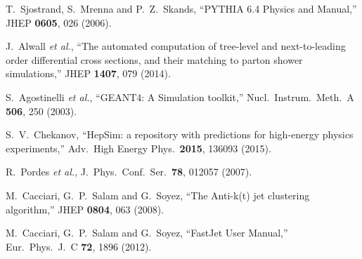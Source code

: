 \documentclass{PoS}
\begin{document}
\begin{thebibliography}{99}
  T.~Sjostrand, S.~Mrenna and P.~Z.~Skands,
  ``PYTHIA 6.4 Physics and Manual,''
  JHEP {\bf 0605}, 026 (2006).

  J.~Alwall {\it et al.},
  ``The automated computation of tree-level and next-to-leading order differential cross sections, and their matching to parton shower simulations,''
  JHEP {\bf 1407}, 079 (2014).




  S.~Agostinelli {\it et al.},
  ``GEANT4: A Simulation toolkit,''
  Nucl.\ Instrum.\ Meth.\ A {\bf 506}, 250 (2003).


  S.~V.~Chekanov,
  ``HepSim: a repository with predictions for high-energy physics experiments,''
  Adv.\ High Energy Phys.\  {\bf 2015}, 136093 (2015).

  R.~Pordes {\it et al.},
  J.\ Phys.\ Conf.\ Ser.\  {\bf 78}, 012057 (2007).



  M.~Cacciari, G.~P.~Salam and G.~Soyez,
  ``The Anti-k(t) jet clustering algorithm,''
  JHEP {\bf 0804}, 063 (2008).


  M.~Cacciari, G.~P.~Salam and G.~Soyez,
  ``FastJet User Manual,''
  Eur.\ Phys.\ J.\ C {\bf 72}, 1896 (2012).

\end{thebibliography}
\end{document}
